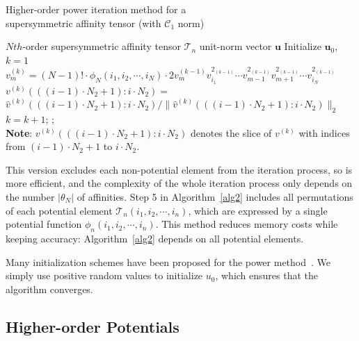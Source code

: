 \begin{algorithm}[!t]
\caption{\small Higher-order power iteration method for a \protect\\
         \mbox{}\hspace{15ex}\small supersymmetric affinity tensor (with $\mathcal{C}_1$ norm)}
\label{alg2}
\begin{algorithmic}[1]
\REQUIRE \small $Nth$-order supersymmetric affinity tensor $\mathcal{T}_n$
\ENSURE  \small unit-norm vector $\boldsymbol{u}$
\STATE   \small \; Initialize $\boldsymbol{u}_0$, $k=1$
\REPEAT
        \STATE \hspace{-3ex}$v_{m}^{(k)}=(N-1)!\cdot \phi_N(i_1,i_2,\cdots , i_N)\cdot 2v_{m}^{(k-1)}v_{i_1}^{2_{(k-1)}}\cdots v_{m-1}^{2_{(k-1)}}v_{m+1}^{2_{(k-1)}}\cdots v_{i_N}^{2_{(k-1)}}$
        \ENDFOR
        \STATE $v^{(k)}(((i-1)\cdot N_2+1) : i\cdot N_2)=$   \protect\\
               $\hat{v}^{(k)}(((i-1)\cdot N_2+1) : i\cdot N_2)/\lVert \hat{v}^{(k)}(((i-1)\cdot N_2+1):i\cdot N_2)\lVert_2$
        \ENDFOR
    \ENDFOR
    \STATE $k=k+1$;
;\protect\\
       \small \textbf{Note}: $v^{(k)}(((i-1)\cdot N_2+1) : i\cdot N_2)$ denotes the slice of $v^{(k)}$ with
       \small indices from $(i-1)\cdot N_2+1$ to $i\cdot N_2$.
\end{algorithmic}
\end{algorithm}

This version excludes each non-potential element from the iteration process, so is more efficient, and the complexity of the whole iteration process only depends on the number $|\theta_N|$ of affinities. Step 5 in Algorithm~\ref{alg2} includes all permutations of each potential element $\mathcal{T}_n(i_1,i_2,\cdots,i_n)$, which are expressed by a single potential function $\phi_n(i_1,i_2,\cdots,i_n)$. This method reduces memory costs while keeping accuracy: Algorithm~\ref{alg2} depends on all potential elements.

Many initialization schemes have been proposed for the power method~\cite{Kofidis02}. We simply use positive random values to initialize $u_0$, which ensures that the algorithm converges.

\subsection{Higher-order Potentials}
\label{subsec:potentials}

